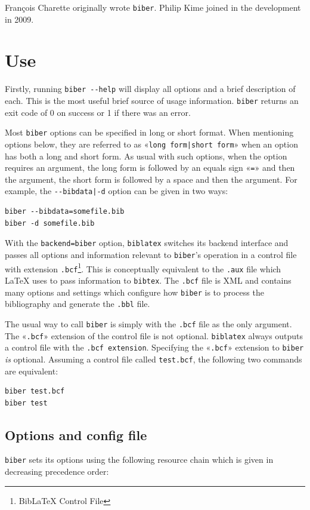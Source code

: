 \documentclass{ltxdockit}
\begin{document}
François Charette originally wrote \verb+biber+. Philip Kime joined in
the development in 2009.

\section{Use}

Firstly, running \verb+biber --help+ will display all options and a brief
description of each. This is the most useful brief source of usage
information. \verb+biber+ returns an exit code of 0 on success or 1 if
there was an error.

Most \verb+biber+ options can be specified in long or short format. When
mentioning options below, they are referred to as
«\verb+long form|short form+» when an option has both a long and short
form. As usual with such options, when the option requires an argument, the
long form is followed by an equals sign «\verb+=+» and then the argument,
the short form is followed by a space and then the argument. For example,
the \verb+--bibdata|-d+ option can be given in two ways:

\begin{verbatim}
biber --bibdata=somefile.bib
biber -d somefile.bib
\end{verbatim}

With the \verb+backend=biber+ option, \verb+biblatex+ switches its backend
interface and passes all options and information relevant to \verb+biber+'s
operation in a control file with extension \verb+.bcf+\footnote{BibLaTeX Control
  File}. This is conceptually equivalent to the \verb+.aux+ file which
LaTeX uses to pass information to \verb+bibtex+. The \verb+.bcf+ file is
XML and contains many options and settings which configure how \verb+biber+
is to process the bibliography and generate the \verb+.bbl+ file.

The usual way to call \verb+biber+ is simply with the \verb+.bcf+ file
as the only argument. The «\verb+.bcf+» extension of the control file
is not optional. \verb+biblatex+ always outputs a control file with
the \verb+.bcf extension+. Specifying the «\verb+.bcf+» extension to
\verb+biber+ \emph{is} optional. Assuming a control file called
\verb+test.bcf+, the following two commands are equivalent:

\begin{verbatim}
biber test.bcf
biber test
\end{verbatim}

\subsection{Options and config file}
\verb+biber+ sets its options using the following resource 
chain which is given in decreasing precedence order:\\[2ex]
\end{document}
